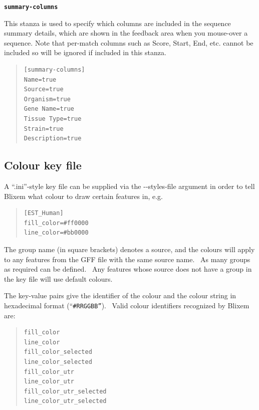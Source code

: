 \documentclass[letterpaper]{article}
\newcommand\textstyleSourceText[1]{\texttt{#1}}
\begin{document}
{\textstyleSourceText{\textrm{\textbf{summary-columns }}}}

This stanza is used to specify which columns are included in the sequence summary details, which are shown in the feedback area when you mouse-over a sequence.  Note that per-match columns such as Score, Start, End, etc. cannot be included so will be ignored if included in this stanza.

\begin{quote}
\begin{verbatim}
[summary-columns]
Name=true
Source=true
Organism=true
Gene Name=true
Tissue Type=true
Strain=true
Description=true
\end{verbatim}
\end{quote}

{\color[rgb]{0.30980393,0.5058824,0.7411765}\subsection[Colour key file ]{Colour key file }}
\hypertarget{RefHeading30392057371307}{}{
A {\textquotedblleft}.ini{\textquotedblright}-style key file can be
supplied via the -{}-styles-file argument in order to tell Blixem what
colour to draw certain features in, e.g.}

\bigskip

\begin{quote}
\begin{verbatim}
[EST_Human]
fill_color=#ff0000
line_color=#bb0000
\end{verbatim}
\end{quote}

{The group name (in square brackets) denotes a source, and the colours
will apply to any features from the GFF file with the same source name.
\ As many groups as required can be defined. \ Any features whose
source does not have a group in the key file will use default colours.}

\bigskip

{The key-value pairs give the identifier of the colour and the colour
string in hexadecimal format
({\textquotedblleft}\texttt{\#RRGGBB{\textquotedblright}}). \ Valid colour
identifiers recognized by Blixem are:}

\begin{quote}
\begin{verbatim}
fill_color
line_color
fill_color_selected
line_color_selected
fill_color_utr
line_color_utr
fill_color_utr_selected
line_color_utr_selected
\end{verbatim}
\end{quote}
\end{document}
